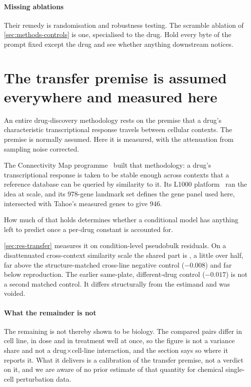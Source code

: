 \paragraph{Missing ablations} Their remedy is randomisation and robustness
testing. The scramble ablation of \cref{sec:methods-controls} is one, specialised
to the drug. Hold every byte of the prompt fixed except the drug and see whether
anything downstream notices.

\section{The transfer premise is assumed everywhere and measured here}
\label{sec:lit-cmap}
\framedecl{-}

\begin{question}
An entire drug-discovery methodology rests on the premise that a drug's
characteristic transcriptional response travels between cellular contexts. The
premise is normally assumed. Here it is measured, with the attenuation from
sampling noise corrected.
\end{question}

\noindent
The Connectivity Map programme~\cite{cmap,l1000} built that methodology: a drug's
transcriptional response is taken to be stable enough across contexts that a
reference database can be queried by similarity to it. Its L1000
platform~\cite{l1000} ran the idea at scale, and its 978-gene landmark set
defines the gene panel used here, intersected with Tahoe's measured genes to give
$946$.

How much of that holds determines whether a conditional model has anything left
to predict once a per-drug constant is accounted for.

\cref{sec:res-transfer} measures it on condition-level pseudobulk residuals. On a
disattenuated cross-context similarity scale the shared part is
, a little over half, far above the
structure-matched cross-line negative control ($-0.008$) and far below
reproduction. The earlier same-plate, different-drug control ($-0.017$) is not a
second matched control. It differs structurally from the estimand and was
voided.

\paragraph{What the remainder is not} The remaining 
is not thereby shown to be biology. The compared pairs differ in cell line, in
dose and in treatment well at once, so the figure is not a variance share and not
a drug$\times$cell-line interaction, and the section says so where it reports it.
What it delivers is a calibration of the transfer premise, not a verdict on it,
and we are aware of no prior estimate of that quantity for chemical single-cell
perturbation data.

